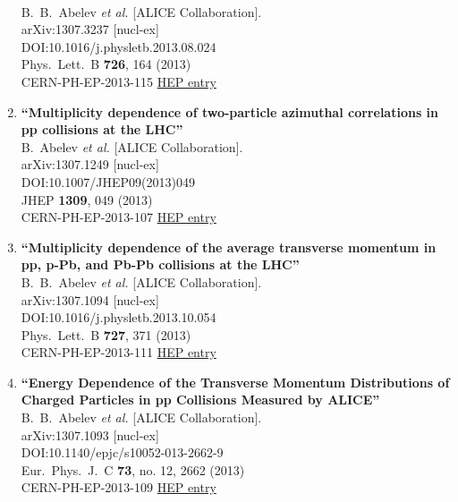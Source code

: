 \begin{enumerate}
  \\{}B.~B.~Abelev {\it et al.} [ALICE Collaboration].
  \\{}arXiv:1307.3237 [nucl-ex]
  \\{}DOI:10.1016/j.physletb.2013.08.024
  \\{}Phys.\ Lett.\ B {\bf 726}, 164 (2013)
  \\{}CERN-PH-EP-2013-115
\href{http://inspirehep.net/record/1242302}{HEP entry}
\item%
{\bf ``Multiplicity dependence of two-particle azimuthal correlations in pp collisions at the LHC''}
  \\{}B.~Abelev {\it et al.} [ALICE Collaboration].
  \\{}arXiv:1307.1249 [nucl-ex]
  \\{}DOI:10.1007/JHEP09(2013)049
  \\{}JHEP {\bf 1309}, 049 (2013)
  \\{}CERN-PH-EP-2013-107
\href{http://inspirehep.net/record/1241570}{HEP entry}
\item%
{\bf ``Multiplicity dependence of the average transverse momentum in pp, p-Pb, and Pb-Pb collisions at the LHC''}
  \\{}B.~B.~Abelev {\it et al.} [ALICE Collaboration].
  \\{}arXiv:1307.1094 [nucl-ex]
  \\{}DOI:10.1016/j.physletb.2013.10.054
  \\{}Phys.\ Lett.\ B {\bf 727}, 371 (2013)
  \\{}CERN-PH-EP-2013-111
\href{http://inspirehep.net/record/1241423}{HEP entry}
\item%
{\bf ``Energy Dependence of the Transverse Momentum Distributions of Charged Particles in pp Collisions Measured by ALICE''}
  \\{}B.~B.~Abelev {\it et al.} [ALICE Collaboration].
  \\{}arXiv:1307.1093 [nucl-ex]
  \\{}DOI:10.1140/epjc/s10052-013-2662-9
  \\{}Eur.\ Phys.\ J.\ C {\bf 73}, no. 12, 2662 (2013)
  \\{}CERN-PH-EP-2013-109
\href{http://inspirehep.net/record/1241422}{HEP entry}

\end{enumerate}
